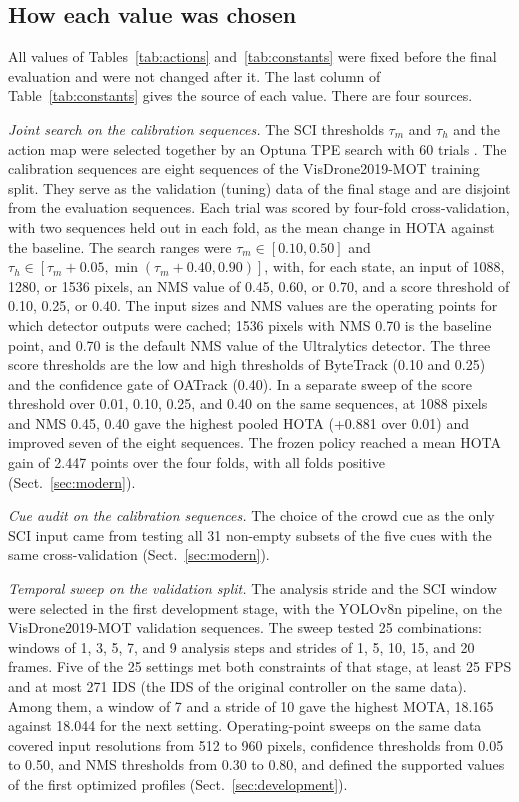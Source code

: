 \documentclass[pdflatex,sn-mathphys-num,iicol]{sn-jnl}
\begin{document}
\subsection{How each value was chosen}\label{sec:constants}
All values of Tables~\ref{tab:actions} and~\ref{tab:constants} were fixed
before the final evaluation and were not changed after it. The last column of
Table~\ref{tab:constants} gives the source of each value. There are four
sources.

\emph{Joint search on the calibration sequences.} The SCI thresholds $\tau_m$
and $\tau_h$ and the action map were selected together by an Optuna TPE search
with 60 trials \cite{akiba2019optuna}. The calibration sequences are eight
sequences of the VisDrone2019-MOT training split. They serve as the validation
(tuning) data of the final stage and are disjoint from the evaluation
sequences. Each trial was scored by four-fold cross-validation, with two
sequences held out in each fold, as the mean change in HOTA against the
baseline. The search ranges were $\tau_m\in[0.10,0.50]$ and
$\tau_h\in[\tau_m+0.05,\min(\tau_m+0.40,0.90)]$, with, for each state, an
input of 1088, 1280, or 1536 pixels, an NMS value of 0.45, 0.60, or 0.70,
and a score threshold of 0.10, 0.25, or 0.40. The input sizes and NMS values
are the operating points for which detector outputs were cached; 1536 pixels
with NMS 0.70 is the baseline point, and 0.70 is the default NMS value of the
Ultralytics detector. The three score thresholds are the low and high
thresholds of ByteTrack (0.10 and 0.25) and the confidence gate of OATrack
(0.40). In a separate sweep of the score threshold over 0.01, 0.10, 0.25, and
0.40 on the same sequences, at 1088 pixels and NMS 0.45, 0.40 gave the highest
pooled HOTA (+0.881 over 0.01) and improved seven of the eight sequences. The frozen policy reached a mean HOTA
gain of 2.447 points over the four folds, with all folds positive
(Sect.~\ref{sec:modern}).

\emph{Cue audit on the calibration sequences.} The choice of the crowd cue as
the only SCI input came from testing all 31 non-empty subsets of the five
cues with the same cross-validation (Sect.~\ref{sec:modern}).

\emph{Temporal sweep on the validation split.} The analysis stride and the
SCI window were selected in the first development stage, with the YOLOv8n
pipeline, on the VisDrone2019-MOT validation sequences. The sweep tested 25
combinations: windows of 1, 3, 5, 7, and 9 analysis steps and strides of 1, 5,
10, 15, and 20 frames. Five of the 25 settings met both constraints of that
stage, at least 25 FPS and at most 271 IDS (the IDS of the original controller
on the same data). Among them, a window of 7 and a stride of 10 gave the
highest MOTA, 18.165 against 18.044 for the next setting. Operating-point
sweeps on the same data covered input resolutions from 512 to 960 pixels,
confidence thresholds from 0.05 to 0.50, and NMS thresholds from 0.30 to 0.80,
and defined the supported values of the first optimized profiles
(Sect.~\ref{sec:development}).
\end{document}
